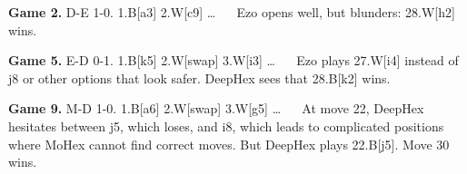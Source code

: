 \documentclass{icga}
\def\Dx{\mbox{\sc DeepHex}}
\def\Eo{\mbox{\sc Ezo}}
\def\Mx{\mbox{\sc MoHex}}
\begin{document}
{\bf Game 2.}
{\sc D-E 1-0.}
1.B[a3] 2.W[c9] \ldots ~ ~
\Eo{} opens well, but blunders: 28.W[h2] wins.



{\bf Game 5.}
{\sc E-D 0-1.}
1.B[k5] 2.W[swap] 3.W[i3] \ldots ~ ~ 
\Eo{} plays 27.W[i4] instead of j8 or other options that look safer. \Dx{} sees that 28.B[k2] wins.




{\bf Game 9.}
{\sc M-D 1-0.}
1.B[a6] 2.W[swap] 3.W[g5] \ldots ~ ~ 
At move 22, \Dx{} hesitates between j5, which loses, and i8,
which leads to complicated positions where \Mx{} cannot 
find correct moves. But \Dx{} plays 22.B[j5]. Move 30 wins.



\end{document}
